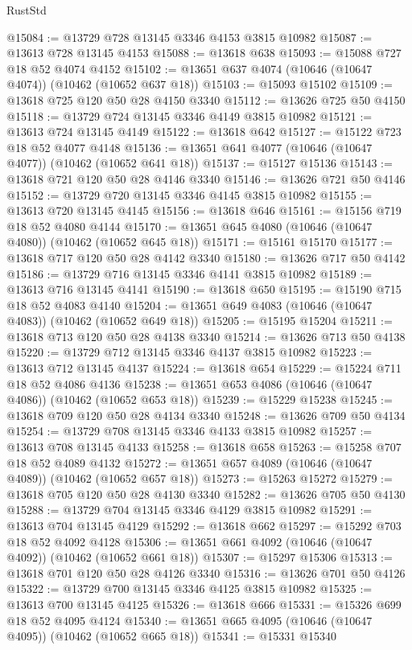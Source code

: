 \begin{lexlean}{RustStd}
\begin{coremodule}
@15084 := @13729 @728 @13145 @3346 @4153 @3815 @10982
@15087 := @13613 @728 @13145 @4153
@15088 := @13618 @638
@15093 := @15088 @727 @18 @52 @4074 @4152
@15102 := @13651 @637 @4074 (@10646 (@10647 @4074)) (@10462 (@10652 @637 @18))
@15103 := @15093 @15102
@15109 := @13618 @725 @120 @50 @28 @4150 @3340
@15112 := @13626 @725 @50 @4150
@15118 := @13729 @724 @13145 @3346 @4149 @3815 @10982
@15121 := @13613 @724 @13145 @4149
@15122 := @13618 @642
@15127 := @15122 @723 @18 @52 @4077 @4148
@15136 := @13651 @641 @4077 (@10646 (@10647 @4077)) (@10462 (@10652 @641 @18))
@15137 := @15127 @15136
@15143 := @13618 @721 @120 @50 @28 @4146 @3340
@15146 := @13626 @721 @50 @4146
@15152 := @13729 @720 @13145 @3346 @4145 @3815 @10982
@15155 := @13613 @720 @13145 @4145
@15156 := @13618 @646
@15161 := @15156 @719 @18 @52 @4080 @4144
@15170 := @13651 @645 @4080 (@10646 (@10647 @4080)) (@10462 (@10652 @645 @18))
@15171 := @15161 @15170
@15177 := @13618 @717 @120 @50 @28 @4142 @3340
@15180 := @13626 @717 @50 @4142
@15186 := @13729 @716 @13145 @3346 @4141 @3815 @10982
@15189 := @13613 @716 @13145 @4141
@15190 := @13618 @650
@15195 := @15190 @715 @18 @52 @4083 @4140
@15204 := @13651 @649 @4083 (@10646 (@10647 @4083)) (@10462 (@10652 @649 @18))
@15205 := @15195 @15204
@15211 := @13618 @713 @120 @50 @28 @4138 @3340
@15214 := @13626 @713 @50 @4138
@15220 := @13729 @712 @13145 @3346 @4137 @3815 @10982
@15223 := @13613 @712 @13145 @4137
@15224 := @13618 @654
@15229 := @15224 @711 @18 @52 @4086 @4136
@15238 := @13651 @653 @4086 (@10646 (@10647 @4086)) (@10462 (@10652 @653 @18))
@15239 := @15229 @15238
@15245 := @13618 @709 @120 @50 @28 @4134 @3340
@15248 := @13626 @709 @50 @4134
@15254 := @13729 @708 @13145 @3346 @4133 @3815 @10982
@15257 := @13613 @708 @13145 @4133
@15258 := @13618 @658
@15263 := @15258 @707 @18 @52 @4089 @4132
@15272 := @13651 @657 @4089 (@10646 (@10647 @4089)) (@10462 (@10652 @657 @18))
@15273 := @15263 @15272
@15279 := @13618 @705 @120 @50 @28 @4130 @3340
@15282 := @13626 @705 @50 @4130
@15288 := @13729 @704 @13145 @3346 @4129 @3815 @10982
@15291 := @13613 @704 @13145 @4129
@15292 := @13618 @662
@15297 := @15292 @703 @18 @52 @4092 @4128
@15306 := @13651 @661 @4092 (@10646 (@10647 @4092)) (@10462 (@10652 @661 @18))
@15307 := @15297 @15306
@15313 := @13618 @701 @120 @50 @28 @4126 @3340
@15316 := @13626 @701 @50 @4126
@15322 := @13729 @700 @13145 @3346 @4125 @3815 @10982
@15325 := @13613 @700 @13145 @4125
@15326 := @13618 @666
@15331 := @15326 @699 @18 @52 @4095 @4124
@15340 := @13651 @665 @4095 (@10646 (@10647 @4095)) (@10462 (@10652 @665 @18))
@15341 := @15331 @15340

\end{coremodule}
\end{lexlean}
